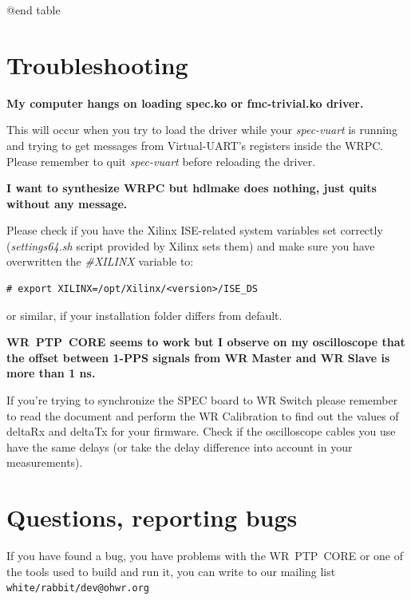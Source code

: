 \documentclass[a4paper, 12pt]{article}
\newcommand{\code}[1]{\texttt{#1}}
\newcommand{\codeHook}[1]{\mbox{\ttfamily\MakeTextUppercase{#1}}}
\begin{document}
@end table

\label{Troubleshooting}
\section{Troubleshooting}

\textbf{My computer hangs on loading spec.ko or fmc-trivial.ko driver.}

This will occur when you try to load the driver while your \textit{spec-vuart} is
running and trying to get messages from Virtual-UART's registers inside the
\codeHook{wrpc}. Please remember to quit \textit{spec-vuart} before reloading the driver.

\vspace{1em}
\textbf{I want to synthesize \codeHook{wrpc} but hdlmake does nothing, just quits without any
message.}

Please check if you have the Xilinx ISE-related system variables set correctly
(\textit{settings64.sh} script provided by Xilinx sets them) and make sure you have
overwritten the \textit{\#XILINX} variable to:

\begin{lstlisting}
# export XILINX=/opt/Xilinx/<version>/ISE_DS
\end{lstlisting}

or similar, if your installation folder differs from default.

\vspace{1em}
\textbf{\codeHook{wr ptp core} seems to work but I observe on my oscilloscope that the offset
between 1-PPS signals from \codeHook{wr} Master and \codeHook{wr} Slave is more than 1 ns.}

If you're trying to synchronize the \codeHook{spec} board to \codeHook{wr} Switch please remember to
read the document and perform the \codeHook{wr} Calibration to find out the values of
deltaRx and deltaTx for your firmware. Check if the oscilloscope cables you use
have the same delays (or take the delay difference into account in your
measurements).


\label{Questions}
\section{Questions, reporting bugs}

If you have found a bug, you have problems with the \codeHook{wr ptp core} or one
of the tools used to build and run it, you can write to our mailing list
\code{white\-/rabbit\-/dev@ohwr.org}
\end{document}
